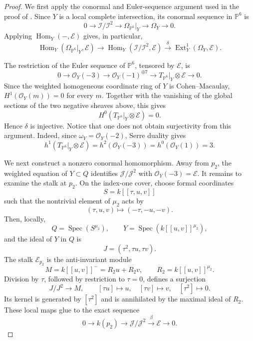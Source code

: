 \documentclass[11pt,twoside]{amsart}
\theoremstyle{plain}
\numberwithin{equation}{section}
\theoremstyle{definition}
\begin{document}
\begin{proof}
We first apply the conormal and Euler-sequence argument used in the proof of \cite[Lemma~3.9]{GGP}. Since $Y$ is a local complete intersection, its conormal sequence in $\mathbb P^6$ is
$$
0\longrightarrow\mathcal I/\mathcal I^2
\longrightarrow\Omega_{\mathbb P^6}|_Y
\longrightarrow\Omega_Y
\longrightarrow0.
$$
Applying $\operatorname{Hom}_Y(-,\mathcal E)$ gives, in particular,
$$
\operatorname{Hom}_Y(\Omega_{\mathbb P^6}|_Y,\mathcal E)
\longrightarrow
\operatorname{Hom}_Y(\mathcal I/\mathcal I^2,\mathcal E)
\xrightarrow{\ \delta\ }
\operatorname{Ext}^1_Y(\Omega_Y,\mathcal E).
$$

The restriction of the Euler sequence of $\mathbb P^6$, tensored by $\mathcal E$, is
$$
0\longrightarrow\mathcal O_Y(-3)
\longrightarrow\mathcal O_Y(-1)^{\oplus 7}
\longrightarrow T_{\mathbb P^6}|_Y\otimes\mathcal E
\longrightarrow0.
$$
Since the weighted homogeneous coordinate ring of $Y$ is Cohen--Macaulay, $H^1(\mathcal O_Y(m))=0$ for every $m$. Together with the vanishing of the global sections of the two negative sheaves above, this gives
$$
H^0(T_{\mathbb P^6}|_Y\otimes\mathcal E)=0.
$$
Hence $\delta$ is injective. Notice that one does not obtain surjectivity from this argument. Indeed, since $\omega_Y=\mathcal O_Y(-2)$, Serre duality gives
$$
h^1(T_{\mathbb P^6}|_Y\otimes\mathcal E)
=h^2(\mathcal O_Y(-3))
=h^0(\mathcal O_Y(1))=3.
$$

We next construct a nonzero conormal homomorphism. Away from $p_2$, the weighted equation of $Y\subset Q$ identifies $\mathcal J/\mathcal J^2$ with $\mathcal O_Y(-3)=\mathcal E$. It remains to examine the stalk at $p_2$. On the index-one cover, choose formal coordinates
$$
S=k[[\tau,u,v]]
$$
such that the nontrivial element of $\mu_2$ acts by
$$
(\tau,u,v)\longmapsto(-\tau,-u,-v).
$$
Then, locally,
$$
Q=\operatorname{Spec}(S^{\mu_2}),
\qquad
Y=\operatorname{Spec}(k[[u,v]]^{\mu_2}),
$$
and the ideal of $Y$ in $Q$ is
$$
J=(\tau^2,\tau u,\tau v).
$$
The stalk $\mathcal E_{p_2}$ is the anti-invariant module
$$
M=k[[u,v]]^-=R_2u+R_2v,
\qquad
R_2=k[[u,v]]^{\mu_2}.
$$
Division by $\tau$, followed by restriction to $\tau=0$, defines a surjection
$$
J/J^2\longrightarrow M,
\qquad
[\tau u]\longmapsto u,\quad
[\tau v]\longmapsto v,\quad
[\tau^2]\longmapsto0.
$$
Its kernel is generated by $[\tau^2]$ and is annihilated by the maximal ideal of $R_2$. These local maps glue to the exact sequence
$$
0\longrightarrow k(p_2)
\longrightarrow\mathcal J/\mathcal J^2
\xrightarrow{\ \beta\ }\mathcal E
\longrightarrow0.
$$


\end{proof}
\end{document}
